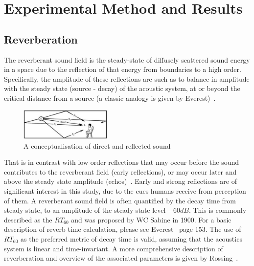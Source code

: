 \documentclass[paper=a4, fontsize=10pt, font=arial]{scrartcl} %
\numberwithin{equation}{section} %
\numberwithin{figure}{section} %
\numberwithin{table}{section} %
\begin{document}
\newpage
\section{Experimental Method and Results}
\subsection{Reverberation}

The reverberant sound field is the steady-state of diffusely scattered sound energy in a space due to the reflection of that energy from boundaries to a high order. 
Specifically, the amplitude of these reflections are such as to balance in amplitude with the steady state (source - decay) of the acoustic system, at or beyond the critical distance from a source (a classic analogy is given by Everest)~\cite{Everest2009}. 

\begin{figure}[H]
\centering
\includegraphics[width=0.4\textwidth]{reflection_diagran.jpg}
\centering
\caption{A conceptualisation of direct and reflected sound~\cite{Everest2009}}
\end{figure}

That is in contrast with low order reflections that may occur before the sound contributes to the reverberant field (early reflections), or may occur later and above the steady state amplitude (echos)~\cite{Everest2009}. 
Early and strong reflections are of significant interest in this study, due to the cues humans receive from perception of them. 
A reverberant sound field is often quantified by the decay time from steady state, to an amplitude of the steady state level $-60{dB}$. This is commonly described as the $RT_{60}$ and was proposed by WC Sabine in 1900. For a basic description of reverb time calculation, please see Everest~\cite{Everest2009} page 153.
The use of $RT_{60}$ as the preferred metric of decay time is valid, assuming that the acoustics system is linear and time-invariant.
A more comprehensive description of reverberation and overview of the associated parameters is given by Rossing~\cite{rossing2007springer}. 
\end{document}
